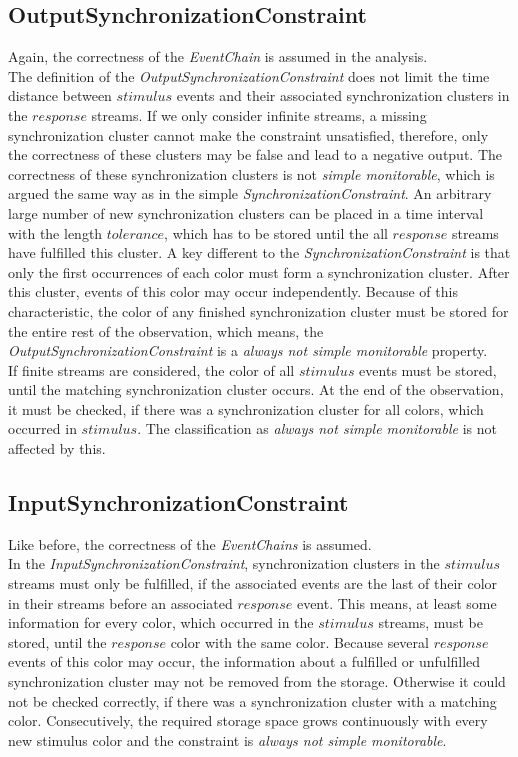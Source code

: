 \subsection{OutputSynchronizationConstraint}
	Again, the correctness of the \textit{EventChain} is assumed in the analysis.\\
	The definition of the \textit{OutputSynchronizationConstraint} does not limit the time distance between $stimulus$ events and their associated synchronization clusters in the $response$ streams. If we only consider infinite streams, a missing synchronization cluster cannot make the constraint unsatisfied, therefore, only the correctness of these clusters may be false and lead to a negative output. The correctness of these synchronization clusters is not \textit{simple monitorable}, which is argued the same way as in the simple \textit{SynchronizationConstraint}. An arbitrary large number of new synchronization clusters can be placed in a time interval with the length $tolerance$, which has to be stored until the all $response$ streams have fulfilled this cluster. A key different to the \textit{SynchronizationConstraint} is that only the first occurrences of each color must form a synchronization cluster. After this cluster, events of this color may occur independently. Because of this characteristic, the color of any finished synchronization cluster must be stored for the entire rest of the observation, which means, the \textit{OutputSynchronizationConstraint} is a \textit{always not simple monitorable} property.\\
	If finite streams are considered, the color of all $stimulus$ events must be stored, until the matching synchronization cluster occurs. At the end of the observation, it must be checked, if there was a synchronization cluster for all colors, which occurred in $stimulus$. The classification as \textit{always not simple monitorable} is not affected by this.
	

\subsection{InputSynchronizationConstraint}
	Like before, the correctness of the \textit{EventChains} is assumed.\\
	In the \textit{InputSynchronizationConstraint}, synchronization clusters in the $stimulus$ streams must only be fulfilled, if the associated events are the last of their color in their streams before an associated $response$ event. This means, at least some information for every color, which occurred in the $stimulus$ streams, must be stored, until the $response$ color with the same color.  Because several $response$ events of this color may occur, the information about a fulfilled or unfulfilled synchronization cluster may not be removed from the storage. Otherwise it could not be checked correctly, if there was a synchronization cluster with a matching color. Consecutively, the required storage space grows continuously with every new stimulus color and the constraint is \textit{always not simple monitorable}. 
	
